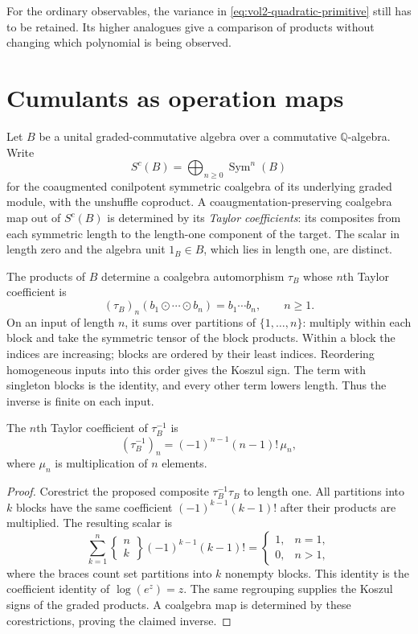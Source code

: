 For the ordinary observables, the variance in
\eqref{eq:vol2-quadratic-primitive} still has to be retained.
Its higher analogues give a comparison of products without
changing which polynomial is being observed.

\section{Cumulants as operation maps}
\label{sec:vol2-state-cumulants}

Let $B$ be a unital graded-commutative algebra over a commutative
$\mathbb Q$-algebra. Write
\[
 S^c(B)=\bigoplus_{n\geq0}\operatorname{Sym}^n(B)
\]
for the coaugmented conilpotent symmetric coalgebra of its
underlying graded module, with the unshuffle coproduct.
A coaugmentation-preserving coalgebra map out of $S^c(B)$ is
determined by its \emph{Taylor coefficients}: its composites
from each symmetric length to the length-one component of the
target. The scalar in length zero and the algebra unit
$1_B\in B$, which lies in length one, are distinct.

The products of $B$ determine a coalgebra automorphism $\tau_B$
whose $n$th Taylor coefficient is
\[
 (\tau_B)_n(b_1\odot\cdots\odot b_n)=b_1\cdots b_n,
 \qquad n\geq1.
\]
On an input of length $n$, it sums over partitions of
$\{1,\ldots,n\}$: multiply within each block and take the
symmetric tensor of the block products. Within a block the
indices are increasing; blocks are ordered by their least
indices. Reordering homogeneous inputs into this order gives
the Koszul sign. The term with singleton blocks is the identity,
and every other term lowers length. Thus the inverse is finite
on each input.

\begin{lemma}\label{lem:vol2-cumulant-inverse}
The $n$th Taylor coefficient of $\tau_B^{-1}$ is
\[
 (\tau_B^{-1})_n=(-1)^{n-1}(n-1)!\,\mu_n,
\]
where $\mu_n$ is multiplication of $n$ elements.
\end{lemma}
\begin{proof}
Corestrict the proposed composite $\tau_B^{-1}\tau_B$ to length
one. All partitions into $k$ blocks have the same coefficient
$(-1)^{k-1}(k-1)!$ after their products are multiplied.
The resulting scalar is
\[
 \sum_{k=1}^n
 \left\{\begin{matrix}n\\k\end{matrix}\right\}
                       (-1)^{k-1}(k-1)! =
 \begin{cases}1,&n=1,\\0,&n>1,\end{cases}
\]
where the braces count set partitions into $k$ nonempty blocks.
This identity is the coefficient identity of
$\log(e^z)=z$. The same regrouping supplies the Koszul signs
of the graded products. A coalgebra map is determined by these
corestrictions, proving the claimed inverse.
\end{proof}

